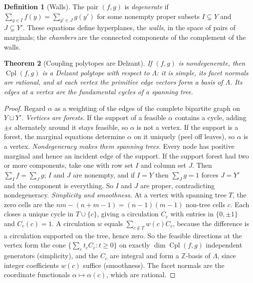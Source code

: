 \documentclass[11pt]{article}
\newtheorem{theorem}{Theorem}[section]
\theoremstyle{definition}
\newtheorem{definition}[theorem]{Definition}
\theoremstyle{remark}
\newcommand{\Cpl}{\operatorname{Cpl}}
\begin{document}
\begin{definition}[Walls]\label{def:walls}
The pair $(f,g)$ is \emph{degenerate} if $\sum_{y\in I}f(y)=\sum_{y'\in J}g(y')$ for some
nonempty proper subsets $I\subsetneq Y$ and $J\subsetneq Y'$. These equations define hyperplanes,
the \emph{walls}, in the space of pairs of marginals; the \emph{chambers} are the connected components of
the complement of the walls.
\end{definition}

\begin{theorem}[Coupling polytopes are Delzant]\label{thm:delzant}
If $(f,g)$ is nondegenerate, then $\Cpl(f,g)$ is a Delzant polytope with respect to $\Lambda$: it is
simple, its facet normals are rational, and at each vertex the primitive edge vectors form a basis of
$\Lambda$. Its edges at a vertex are the fundamental cycles of a spanning tree.
\end{theorem}
\begin{proof}
Regard $\alpha$ as a weighting of the edges of the complete bipartite graph on $Y\sqcup Y'$.
\emph{Vertices are forests.} If the support of a feasible $\alpha$ contains a cycle, adding $\pm\epsilon$
alternately around it stays feasible, so $\alpha$ is not a vertex. If the support is a forest, the
marginal equations determine $\alpha$ on it uniquely (peel off leaves), so $\alpha$ is a vertex.
\emph{Nondegeneracy makes them spanning trees.} Every node has positive marginal and hence an incident
edge of the support. If the support forest had two or more components, take one with row set $I$ and
column set $J$. Then $\sum_If=\sum_Jg$; $I$ and $J$ are nonempty, and if $I=Y$ then $\sum_Jg=1$ forces
$J=Y'$ and the component is everything. So $I$ and $J$ are proper, contradicting nondegeneracy.
\emph{Simplicity and smoothness.} At a vertex with spanning tree $T$, the zero cells are the
$nm-(n+m-1)=(n-1)(m-1)$ non-tree cells $c$. Each closes a unique cycle in $T\cup\{c\}$, giving a
circulation $C_c$ with entries in $\{0,\pm1\}$ and $C_c(c)=1$. A circulation $w$ equals
$\sum_{c\notin T}w(c)C_c$, because the difference is a circulation supported on the tree, hence zero.
So the feasible directions at the vertex form the cone $\{\sum_ct_cC_c:t\ge0\}$ on exactly
$\dim\Cpl(f,g)$ independent generators (simplicity), and the $C_c$ are integral and form a $\mathbb{Z}$-basis
of $\Lambda$, since integer coefficients $w(c)$ suffice (smoothness). The facet normals are the coordinate
functionals $\alpha\mapsto\alpha(c)$, which are rational.
\end{proof}
\end{document}
